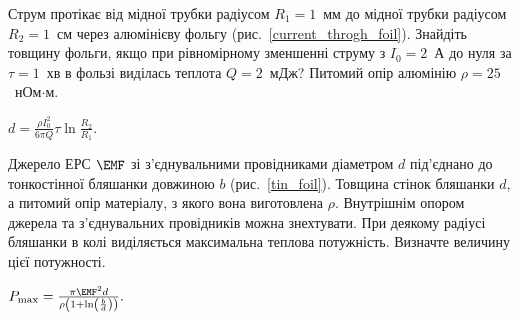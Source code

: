 \begin{problem}\label{prb:current_throgh_foil}
    Струм протікає від мідної трубки радіусом $R_1 = 1$~мм до мідної трубки радіусом $R_2 = 1$~см через алюмінієву фольгу (рис.~\ref{current_throgh_foil}). Знайдіть товщину фольги, якщо при рівномірному зменшенні струму з $I_0 = 2$~А до нуля за $\tau = 1$~хв в фользі виділась теплота $Q=2$~мДж? Питомий опір алюмінію $\rho = 25$~нОм$\cdot$м. 
\begin{solution}
	$d = \frac{\rho I_0^2}{6\pi Q} \tau \ln\frac{R_2}{R_1}$.
\end{solution}
\end{problem}

\begin{problem}\label{prb:tin_foil}
    Джерело ЕРС $\EMF$ зі з'єднувальними провідниками діаметром $d$ під'єднано до тонкостінної бляшанки довжиною $b$ (рис.~\ref{tin_foil}). Товщина стінок бляшанки $d$, а питомий опір матеріалу, з якого вона виготовлена $\rho$.  Внутрішнім опором джерела та з'єднувальних провідників можна знехтувати. При деякому  радіусі  бляшанки в колі виділяється максимальна теплова потужність. Визначте величину цієї потужності. 
\begin{solution}
	$P_{\max} = \frac{\pi\EMF^2 d}{\rho \left( 1 + \ln\left( \frac{b}{d}\right)  \right) }.$
\end{solution}
\end{problem}

